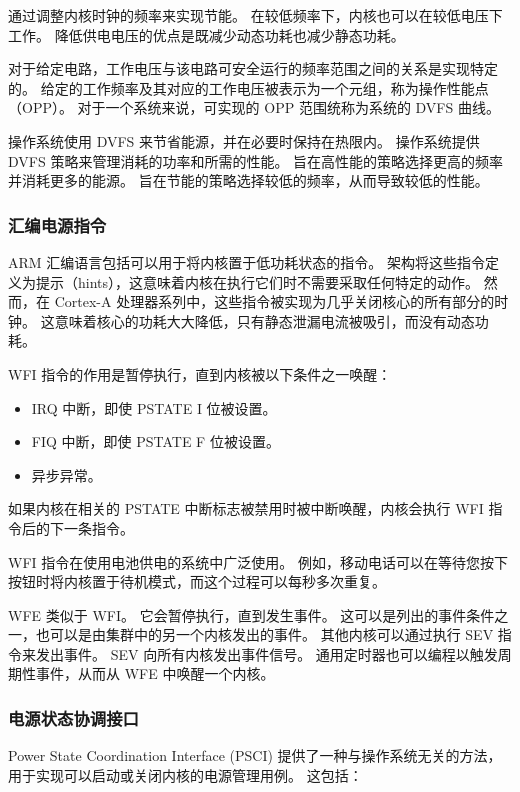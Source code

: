 通过调整内核时钟的频率来实现节能。
在较低频率下，内核也可以在较低电压下工作。
降低供电电压的优点是既减少动态功耗也减少静态功耗。

对于给定电路，工作电压与该电路可安全运行的频率范围之间的关系是实现特定的。
给定的工作频率及其对应的工作电压被表示为一个元组，称为操作性能点（OPP）。
对于一个系统来说，可实现的 OPP 范围统称为系统的 DVFS 曲线。

操作系统使用 DVFS 来节省能源，并在必要时保持在热限内。
操作系统提供 DVFS 策略来管理消耗的功率和所需的性能。
旨在高性能的策略选择更高的频率并消耗更多的能源。
旨在节能的策略选择较低的频率，从而导致较低的性能。

\subsubsection{汇编电源指令}

ARM 汇编语言包括可以用于将内核置于低功耗状态的指令。
架构将这些指令定义为提示（hints），这意味着内核在执行它们时不需要采取任何特定的动作。
然而，在 Cortex-A 处理器系列中，这些指令被实现为几乎关闭核心的所有部分的时钟。
这意味着核心的功耗大大降低，只有静态泄漏电流被吸引，而没有动态功耗。

WFI 指令的作用是暂停执行，直到内核被以下条件之一唤醒：

\begin{itemize}
\item
  IRQ 中断，即使 PSTATE I 位被设置。
\item
  FIQ 中断，即使 PSTATE F 位被设置。
\item
  异步异常。
\end{itemize}

如果内核在相关的 PSTATE 中断标志被禁用时被中断唤醒，内核会执行 WFI 指令后的下一条指令。

WFI 指令在使用电池供电的系统中广泛使用。
例如，移动电话可以在等待您按下按钮时将内核置于待机模式，而这个过程可以每秒多次重复。

WFE 类似于 WFI。
它会暂停执行，直到发生事件。
这可以是列出的事件条件之一，也可以是由集群中的另一个内核发出的事件。
其他内核可以通过执行 SEV 指令来发出事件。
SEV 向所有内核发出事件信号。
通用定时器也可以编程以触发周期性事件，从而从 WFE 中唤醒一个内核。

\subsubsection{电源状态协调接口}\label{sec:pm-state-coordination-if}

Power State Coordination Interface (PSCI) 提供了一种与操作系统无关的方法，用于实现可以启动或关闭内核的电源管理用例。
这包括：

